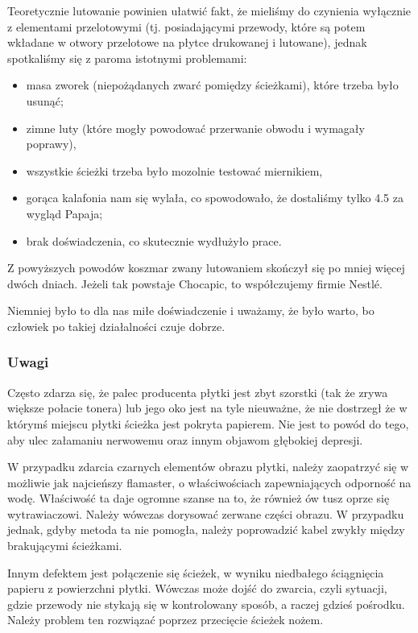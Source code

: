 Teoretycznie lutowanie powinien ułatwić fakt, że mieliśmy do czynienia wyłącznie z elementami przelotowymi (tj. posiadającymi przewody, które są potem wkładane w otwory przelotowe na płytce drukowanej i lutowane), jednak spotkaliśmy się z paroma istotnymi problemami:

\begin{itemize}
\item masa zworek (niepożądanych zwarć pomiędzy ścieżkami), które trzeba było usunąć;
\item zimne luty (które mogły powodować przerwanie obwodu i wymagały poprawy),
\item wszystkie ścieżki trzeba było mozolnie testować miernikiem,
\item gorąca kalafonia nam się wylała, co spowodowało, że dostaliśmy tylko 4.5 za wygląd Papaja;
\item brak doświadczenia, co skutecznie wydłużyło prace.
\end{itemize}

Z powyższych powodów koszmar zwany lutowaniem skończył się po mniej więcej dwóch dniach. Jeżeli tak powstaje Chocapic, to współczujemy firmie Nestlé. 

Niemniej było to dla nas miłe doświadczenie i uważamy, że było warto, bo człowiek po takiej działalności czuje dobrze.

\subsubsection{Uwagi}

Często zdarza się, że palec producenta płytki jest zbyt szorstki (tak że zrywa większe połacie tonera) lub jego oko jest na tyle nieuważne, że nie dostrzegł że w którymś miejscu płytki ścieżka jest pokryta papierem. Nie jest to powód do tego, aby ulec załamaniu nerwowemu oraz innym objawom głębokiej depresji.

W przypadku zdarcia czarnych elementów obrazu płytki, należy zaopatrzyć się w możliwie jak najcieńszy flamaster, o właściwościach zapewniających odporność na wodę. Właściwość ta daje ogromne szanse na to, że również ów tusz oprze się wytrawiaczowi. Należy wówczas dorysować zerwane części obrazu. W przypadku jednak, gdyby metoda ta nie pomogła, należy poprowadzić kabel zwykły między brakującymi ścieżkami. 

Innym defektem jest połączenie się ścieżek, w wyniku niedbałego ściągnięcia papieru z powierzchni płytki. Wówczas może dojść do zwarcia, czyli sytuacji, gdzie przewody nie stykają się w kontrolowany sposób, a raczej gdzieś pośrodku. Należy problem ten rozwiązać poprzez przecięcie ścieżek nożem. 

